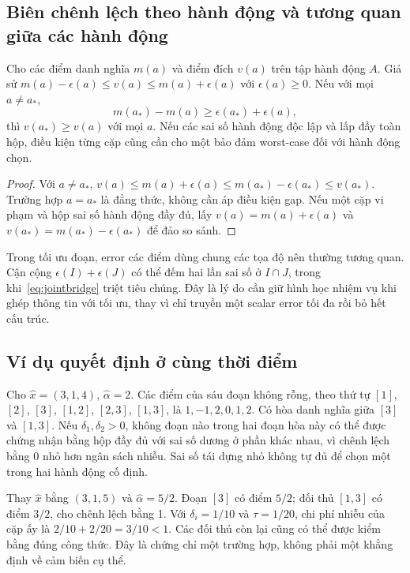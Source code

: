 \subsection{Biên chênh lệch theo hành động và tương quan giữa các hành động}
\begin{proposition}\label{prop:actionmargin}
Cho các điểm danh nghĩa $m(a)$ và điểm đích $v(a)$ trên tập hành động $A$. Giả sử $m(a)-\epsilon(a)\le v(a)\le m(a)+\epsilon(a)$ với $\epsilon(a)\ge0$. Nếu với mọi $a\ne a_*$,
\[
m(a_*)-m(a)\ge\epsilon(a_*)+\epsilon(a),
\]
thì $v(a_*)\ge v(a)$ với mọi $a$. Nếu các sai số hành động độc lập và lấp đầy toàn hộp, điều kiện từng cặp cũng cần cho một bảo đảm worst-case đối với hành động chọn.
\end{proposition}
\begin{proof}
Với $a\ne a_*$, $v(a)\le m(a)+\epsilon(a)\le m(a_*)-\epsilon(a_*)\le v(a_*)$. Trường hợp $a=a_*$ là đẳng thức, không cần áp điều kiện gap. Nếu một cặp vi phạm và hộp sai số hành động đầy đủ, lấy $v(a)=m(a)+\epsilon(a)$ và $v(a_*)=m(a_*)-\epsilon(a_*)$ để đảo so sánh.
\end{proof}
Trong tối ưu đoạn, error các điểm dùng chung các tọa độ nên thường tương quan. Cận cộng $\epsilon(I)+\epsilon(J)$ có thể đếm hai lần sai số ở $I\cap J$, trong khi~\eqref{eq:jointbridge} triệt tiêu chúng. Đây là lý do cần giữ hình học nhiệm vụ khi ghép thông tin với tối ưu, thay vì chỉ truyền một scalar error tối đa rồi bỏ hết cấu trúc.

\subsection{Ví dụ quyết định ở cùng thời điểm}
Cho $\widehat x=(3,1,4)$, $\widehat\alpha=2$. Các điểm của sáu đoạn không rỗng, theo thứ tự $[1]$, $[2]$, $[3]$, $[1,2]$, $[2,3]$, $[1,3]$, là $1,-1,2,0,1,2$. Có hòa danh nghĩa giữa $[3]$ và $[1,3]$. Nếu $\delta_1,\delta_2>0$, không đoạn nào trong hai đoạn hòa này có thể được chứng nhận bằng hộp đầy đủ với sai số dương ở phần khác nhau, vì chênh lệch bằng 0 nhỏ hơn ngân sách nhiễu. Sai số tái dựng nhỏ không tự đủ để chọn một trong hai hành động cố định.

Thay $\widehat x$ bằng $(3,1,5)$ và $\widehat\alpha=5/2$. Đoạn $[3]$ có điểm $5/2$; đối thủ $[1,3]$ có điểm $3/2$, cho chênh lệch bằng 1. Với $\delta_i=1/10$ và $\tau=1/20$, chi phí nhiễu của cặp ấy là $2/10+2/20=3/10<1$. Các đối thủ còn lại cũng có thể được kiểm bằng đúng công thức. Đây là chứng chỉ một trường hợp, không phải một khẳng định về cảm biến cụ thể.
